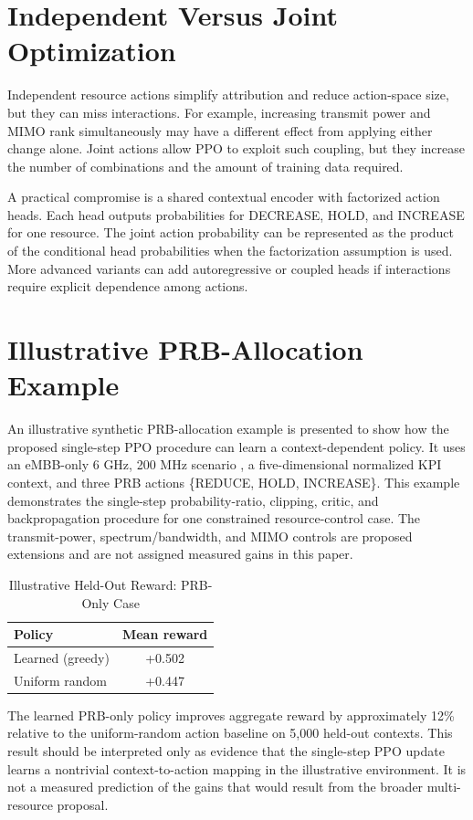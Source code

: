 \documentclass[conference]{IEEEtran}
\begin{document}
\section{Independent Versus Joint Optimization}
Independent resource actions simplify attribution and reduce action-space size, but they can miss interactions. For example, increasing transmit power and MIMO rank simultaneously may have a different effect from applying either change alone. Joint actions allow PPO to exploit such coupling, but they increase the number of combinations and the amount of training data required.

A practical compromise is a shared contextual encoder with factorized action heads. Each head outputs probabilities for DECREASE, HOLD, and INCREASE for one resource. The joint action probability can be represented as the product of the conditional head probabilities when the factorization assumption is used. More advanced variants can add autoregressive or coupled heads if interactions require explicit dependence among actions.

\section{Illustrative PRB-Allocation Example}
An illustrative synthetic PRB-allocation example is presented to show how the proposed single-step PPO procedure can learn a context-dependent policy. It uses an eMBB-only 6 GHz, 200 MHz scenario \cite{38104}, a five-dimensional normalized KPI context, and three PRB actions \{REDUCE, HOLD, INCREASE\}. This example demonstrates the single-step probability-ratio, clipping, critic, and backpropagation procedure for one constrained resource-control case. The transmit-power, spectrum/bandwidth, and MIMO controls are proposed extensions and are not assigned measured gains in this paper.

\begin{table}[t]
\caption{Illustrative Held-Out Reward: PRB-Only Case}
\centering\footnotesize
\begin{tabular}{lc}
\toprule
Policy & Mean reward\\
\midrule
Learned (greedy) & +0.502\\
Uniform random & +0.447\\
\bottomrule
\end{tabular}
\end{table}

The learned PRB-only policy improves aggregate reward by approximately 12\% relative to the uniform-random action baseline on 5,000 held-out contexts. This result should be interpreted only as evidence that the single-step PPO update learns a nontrivial context-to-action mapping in the illustrative environment. It is not a measured prediction of the gains that would result from the broader multi-resource proposal.
\end{document}
